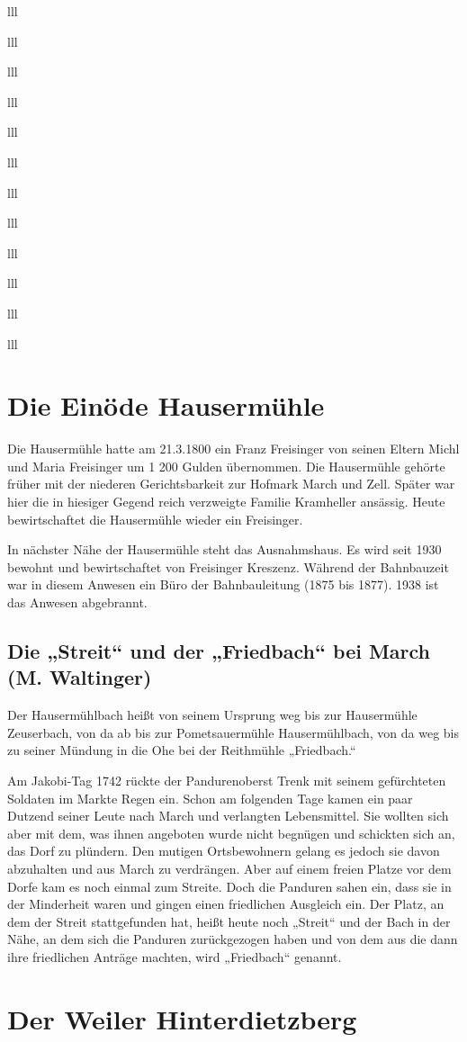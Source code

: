 \documentclass[12pt,a4pager]{book}
\begin{document}
\begin{tabuluar}{lll}
\begin{tabuluar}{lll}
\begin{tabuluar}{lll}
\begin{tabuluar}{lll}
\begin{tabuluar}{lll}
\begin{tabuluar}{lll}
\begin{tabuluar}{lll}
\begin{tabuluar}{lll}
\begin{tabuluar}{lll}
\begin{tabuluar}{lll}
\begin{tabuluar}{lll}
\begin{tabuluar}{lll}
\section{Die Einöde Hausermühle}

Die Hausermühle hatte am 21.3.1800 ein Franz Freisinger von seinen Eltern Michl
und Maria Freisinger um 1 200 Gulden übernommen. Die Hausermühle gehörte früher
mit der niederen Gerichtsbarkeit zur Hofmark March und Zell. Später war hier die
in hiesiger Gegend reich verzweigte Familie Kramheller ansässig. Heute
bewirtschaftet die Hausermühle wieder ein Freisinger.

In nächster Nähe der Hausermühle steht das Ausnahmshaus. Es wird seit 1930
bewohnt und bewirtschaftet von Freisinger Kreszenz. Während der Bahnbauzeit war
in diesem Anwesen ein Büro der Bahnbauleitung (1875 bis 1877). 1938 ist das
Anwesen abgebrannt.

\subsection{Die „Streit“ und der „Friedbach“ bei March (M. Waltinger)}

Der Hausermühlbach heißt von seinem Ursprung weg bis zur Hausermühle Zeuserbach,
von da ab bis zur Pometsauermühle Hausermühlbach, von da weg bis zu seiner
Mündung in die Ohe bei der Reithmühle „Friedbach.“

Am Jakobi-Tag 1742 rückte der Pandurenoberst Trenk mit seinem gefürchteten
Soldaten im Markte Regen ein. Schon am folgenden Tage kamen ein paar Dutzend
seiner Leute nach March und verlangten Lebensmittel. Sie wollten sich aber mit
dem, was ihnen angeboten wurde nicht begnügen und schickten sich an, das Dorf zu
plündern. Den mutigen Ortsbewohnern gelang es jedoch sie davon abzuhalten und
aus March zu verdrängen. Aber auf einem freien Platze vor dem Dorfe kam es noch
einmal zum Streite. Doch die Panduren sahen ein, dass sie in der Minderheit
waren und gingen einen friedlichen Ausgleich ein. Der Platz, an dem der Streit
stattgefunden hat, heißt heute noch „Streit“ und der Bach in der Nähe, an dem
sich die Panduren zurückgezogen haben und von dem aus die dann ihre friedlichen
Anträge machten, wird „Friedbach“ genannt.

\section{Der Weiler Hinterdietzberg}


\end{tabuluar}
\end{tabuluar}
\end{tabuluar}
\end{tabuluar}
\end{tabuluar}
\end{tabuluar}
\end{tabuluar}
\end{tabuluar}
\end{tabuluar}
\end{tabuluar}
\end{tabuluar}
\end{tabuluar}
\end{document}
